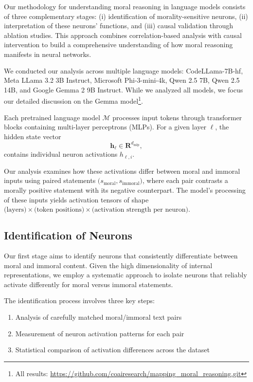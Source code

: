 \documentclass[runninghheads]{llncs}
\begin{document}
Our methodology for understanding moral reasoning in language models consists of three complementary stages: (i) identification of morality-sensitive neurons, (ii) interpretation of these neurons' functions, and (iii) causal validation through ablation studies. This approach combines correlation-based analysis with causal intervention to build a comprehensive understanding of how moral reasoning manifests in neural networks.

We conducted our analysis across multiple language models: CodeLLama-7B-hf, Meta LLama 3.2 3B Instruct, Microsoft Phi-3-mini-4k, Qwen 2.5 7B, Qwen 2.5 14B, and Google Gemma 2 9B Instruct. While we analyzed all models, we focus our detailed discussion on the Gemma model\footnote{All results: \href{https://github.com/coairesearch/mapping_moral_reasoning.git}{https://github.com/coairesearch/mapping\_moral\_reasoning.git}}.

Each pretrained language model $\mathcal{M}$ processes input tokens through transformer blocks containing multi-layer perceptrons (MLPs). For a given layer  $\ell$, the hidden state vector
$$
\mathbf{h}_{\ell} \in \mathbf{R}^{d_{\text{mlp}}}, 
$$
contains individual neuron activations $h_{\ell, i}$. 

Our analysis examines how these activations differ between moral and immoral inputs using paired statements $\bigl(s_{\mathrm{moral}}, s_{\mathrm{immoral}}\bigr)$, where each pair contrasts a morally positive statement with its negative counterpart. 
The model's processing of these inputs yields activation tensors of shape $\text{(layers)} \times \text{(token positions)} \times \text{(activation strength per neuron)}$.

\subsection{Identification of Neurons}
Our first stage aims to identify neurons that consistently differentiate between moral and immoral content. Given the high dimensionality of internal representations, we employ a systematic approach to isolate neurons that reliably activate differently for moral versus immoral statements.

The identification process involves three key steps:
\begin{enumerate}
\item Analysis of carefully matched moral/immoral text pairs
\item Measurement of neuron activation patterns for each pair
\item Statistical comparison of activation differences across the dataset
\end{enumerate}
\end{document}
